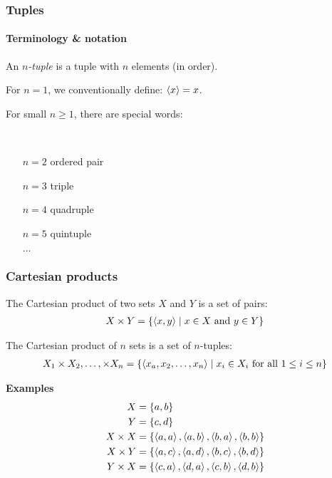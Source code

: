 \documentclass[fleqn,10pt,serif,xcolor=svgnames,xcolor=table,aspectratio=169,handout]{beamer}
\begin{document}
\begin{frame}
  \frametitle{Tuples}
  \framesubtitle{Terminology \& notation}

  An \textit{$n$-tuple} is a tuple with $n$ elements (in order).


  For $n=1$, we conventionally define: $\left \langle x\right\rangle = x$.

  For small $n \ge 1$, there are special words:

  \medskip

  \begin{minipage}{0.15\linewidth}
    \textcolor{white}{test}
  \end{minipage}
  \begin{minipage}{0.4\linewidth}
    \begin{itemize}
      \item[$n=2$] ordered pair
      \item[$n=3$] triple
      \item[$n=4$] quadruple
      \item[$n=5$] quintuple
      \item[] $\dots$
    \end{itemize}
  \end{minipage}
\end{frame}

\begin{frame}
  \frametitle{Cartesian products}

  The Cartesian product of two sets $X$ and $Y$ is a set of pairs:
  \begin{align*}
    X \times Y = \left\{\left \langle x,y\right\rangle \mid x \in X \text{ and } y \in Y\right\}
  \end{align*}

  \bigskip \pause

  The Cartesian product of $n$ sets is a set of $n$-tuples:
  \begin{align*}
    X_{1} \times X_{2}, \dots, \times X_{n} = \left\{\left \langle x_{a},x_{2}, \dots, x_{n}\right\rangle \mid x_{i} \in X_{i} \text{ for all } 1 \le i \le n\right\}
  \end{align*}


  \bigskip \pause

  {\textbf{{\color{themecolor}Examples}}}
  \begin{align*}
    X &= \left\{a,b\right\} \\
    Y &= \left\{c,d\right\} \\
    X \times X & = \left\{\left \langle a,a\right\rangle, \left \langle a,b\right\rangle, \left \langle b,a\right\rangle, \left \langle b,b\right\rangle\right\} \\
    X \times Y & = \left\{\left \langle a,c\right\rangle, \left \langle a,d\right\rangle, \left \langle b,c\right\rangle, \left \langle b,d\right\rangle\right\} \\
    Y \times X & = \left\{\left \langle c,a\right\rangle, \left \langle d,a\right\rangle, \left \langle c,b\right\rangle, \left \langle d,b\right\rangle\right\} \\
  \end{align*}

\end{frame}
\end{document}
